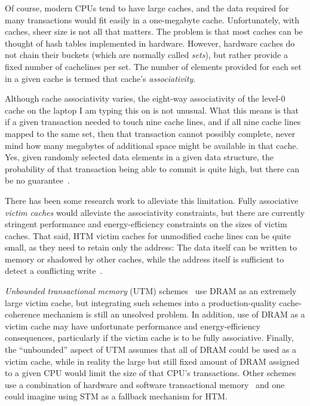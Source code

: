 Of course, modern CPUs tend to have large caches, and the data required
for many transactions would fit easily in a one-megabyte cache.
Unfortunately, with caches, sheer size is not all that matters.
The problem is that most caches
can be thought of hash tables implemented in hardware.
However, hardware caches do not chain their buckets (which are normally
called \emph{sets}), but rather
provide a fixed number of cachelines per set.
The number of elements provided for each set in a given cache
is termed that cache's \emph{associativity}.

Although cache associativity varies, the eight-way associativity of
the level-0 cache on the laptop I am typing this on is not unusual.
What this means is that if a given transaction needed to touch
nine cache lines, and if all nine cache lines mapped to the same
set, then that transaction cannot possibly complete, never mind how
many megabytes of additional space might be available in that cache.
Yes, given randomly selected data elements in a given data structure,
the probability of that transaction being able to commit is quite
high, but there can be no guarantee~\cite{PaulEMcKenney2012HTMCacheGeometry}.

There has been some research work to alleviate this limitation.
Fully associative \emph{victim caches} would alleviate the associativity
constraints, but there are currently stringent performance and
energy-efficiency constraints on the sizes of victim caches.
That said, HTM victim caches for unmodified cache lines can be quite
small, as they need to retain only the address:
The data itself can be written to memory or shadowed by other caches,
while the address itself is sufficient to detect a conflicting
write~\cite{RaviRajwar2012TSX}.

\emph{Unbounded transactional memory} (UTM)
schemes~\cite{CScottAnanian2006,KevinEMoore2006}
use DRAM as an extremely large victim cache, but integrating such schemes
into a production-quality cache-coherence mechanism is still an unsolved
problem.
In addition, use of DRAM as a victim cache may have unfortunate
performance and energy-efficiency consequences, particularly
if the victim cache is to be fully associative.
Finally, the ``unbounded'' aspect of UTM assumes that all of DRAM
could be used as a victim cache, while in reality
the large but still fixed amount of DRAM assigned to a given CPU
would limit the size of that CPU's transactions.
Other schemes use a combination of hardware and software transactional
memory~\cite{SanjeevKumar2006} and one could imagine using STM as a
fallback mechanism for HTM\@.

